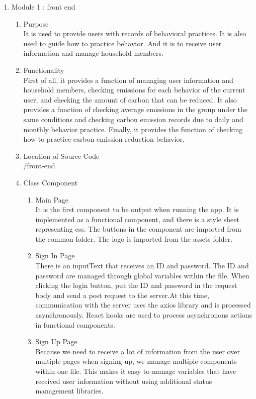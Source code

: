\documentclass[11pt, conference]{IEEEtran}
\begin{document}
\begin{enumerate}[label=\arabic*]
    \item {\large{Module 1 : front end}}
    \begin{enumerate}[label=\alph*]
        \item Purpose\\
        It is used to provide users with records of behavioral practices. It is also used to guide how to practice behavior. And it is to receive user information and manage household members.
        \item Functionality\\
        First of all, it provides a function of managing user information and household members, checking emissions for each behavior of the current user, and checking the amount of carbon that can be reduced. It also provides a function of checking average emissions in the group under the same conditions and checking carbon emission records due to daily and monthly behavior practice. Finally, it provides the function of checking how to practice carbon emission reduction behavior.
        \item Location of Source Code\\
        /front-end
        \item Class Component
        \begin{enumerate}
            \item Main Page\\
            It is the first component to be output when running the app. It is implemented as a functional component, and there is a style sheet representing css. The buttons in the component are imported from the common folder. The logo is imported from the assets folder.
            \item Sign In Page\\
            There is an inputText that receives an ID and password. The ID and password are managed through global variables within the file. When clicking the login button, put the ID and password in the request body and send a post request to the server.At this time, communication with the server uses the axios library and is processed asynchronously. React hooks are used to process asynchronous actions in functional components.
            \item Sign Up Page\\
            Because we need to receive a lot of information from the user over multiple pages when signing up, we manage multiple components within one file. This makes it easy to manage variables that have received user information without using additional status management libraries.

\end{enumerate}
\end{enumerate}
\end{enumerate}
\end{document}
